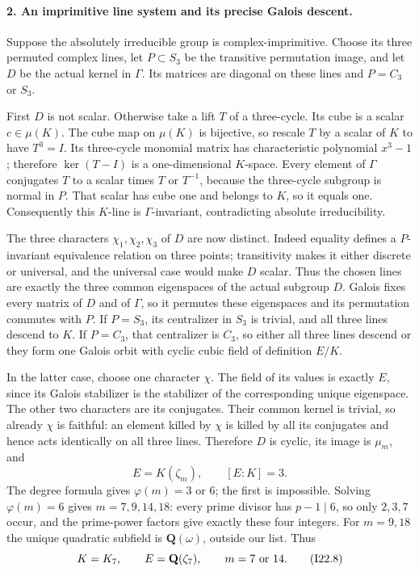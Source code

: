 \paragraph{2. An imprimitive line system and its precise Galois descent.}
Suppose the absolutely irreducible group is complex-imprimitive.
Choose its three permuted complex lines, let
$P\subset S_3$ be the transitive permutation image, and
let $D$ be the actual kernel in $\Gamma$. Its matrices
are diagonal on these lines and $P=C_3$ or $S_3$.

First $D$ is not scalar. Otherwise take a lift $T$ of a
three-cycle. Its cube is a scalar $c\in\mu(K)$.
The cube map on $\mu(K)$ is bijective, so rescale $T$
by a scalar of $K$ to have $T^3=I$. Its three-cycle
monomial matrix has characteristic polynomial $x^3-1$;
therefore $\ker(T-I)$ is a one-dimensional $K$-space.
Every element of $\Gamma$ conjugates $T$ to a scalar
times $T$ or $T^{-1}$, because the three-cycle subgroup
is normal in $P$. That scalar has cube one and belongs
to $K$, so it equals one. Consequently this $K$-line
is $\Gamma$-invariant, contradicting absolute irreducibility.

The three characters $\chi_1,\chi_2,\chi_3$ of $D$
are now distinct. Indeed equality defines a $P$-invariant
equivalence relation on three points; transitivity makes
it either discrete or universal, and the universal case
would make $D$ scalar. Thus the chosen lines are exactly
the three common eigenspaces of the actual subgroup $D$.
Galois fixes every matrix of $D$ and of $\Gamma$, so it
permutes these eigenspaces and its permutation commutes
with $P$. If $P=S_3$, its centralizer in $S_3$ is trivial,
and all three lines descend to $K$. If $P=C_3$, that
centralizer is $C_3$, so either all three lines descend
or they form one Galois orbit with cyclic cubic field
of definition $E/K$.

In the latter case, choose one character $\chi$.
The field of its values is exactly $E$, since its Galois
stabilizer is the stabilizer of the corresponding unique
eigenspace. The other two characters are its conjugates.
Their common kernel is trivial, so already $\chi$ is
faithful: an element killed by $\chi$ is killed by all
its conjugates and hence acts identically on all three
lines. Therefore $D$ is cyclic, its image is $\mu_m$,
and
\[
                 E=K(\zeta_m),\qquad [E:K]=3.              \tag{I22.7}
\]
The degree formula gives $\varphi(m)=3$ or $6$; the
first is impossible. Solving $\varphi(m)=6$ gives
$m=7,9,14,18$: every prime divisor has $p-1\mid6$,
so only $2,3,7$ occur, and the prime-power factors give
exactly these four integers. For $m=9,18$ the unique
quadratic subfield is $\mathbf Q(\omega)$, outside our
list. Thus
\[
                  K=K_7,\qquad E=\mathbf Q(\zeta_7),
                         \qquad m=7\ \hbox{or}\ 14.       \tag{I22.8}
\]

